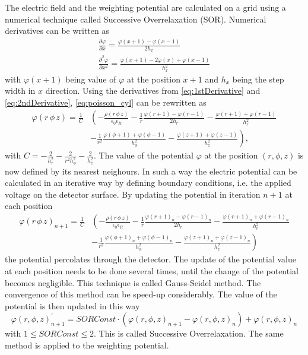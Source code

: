 The electric field and the weighting potential are calculated on a
grid using a numerical technique called Successive Overrelaxation
(SOR). Numerical derivatives can be written as 
\begin{eqnarray}
\frac{\partial \varphi}{\partial x} = \frac{\varphi(x+1) - \varphi(x-1)}{2h_{x}} \label{eq:1stDerivative} \\
\frac{\partial^{2} \varphi}{\partial x^{2}} = \frac{\varphi(x+1) - 2 \varphi(x) + \varphi(x-1)}{h^{2}_{x}} 
\label{eq:2ndDerivative}
\end{eqnarray}
 with $\varphi(x+1)$ being value of $\varphi$ at the
position $x+1$ and $h_{x}$ being the step width in $x$ direction. Using the derivatives from \eqref{eq:1stDerivative} and \eqref{eq:2ndDerivative}, \eqref{eq:poisson_cyl} can be rewritten as 
\begin{equation}
\begin{split}
\varphi(r \,\phi \, z) = 
\frac{1}{C} & \left( -\frac{\rho(r \, \phi \, z)}{\epsilon_{0}
\epsilon_{R}} - \frac{1}{r}\frac{\varphi(r+1) - \varphi(r-1)}{2h_{r}} - 
\frac{\varphi(r+1) + \varphi(r-1)}{h_{r}^{2}} \right. \\ 
& \left. - \frac{1}{r^{2}} \frac{\varphi(\phi+1) + \varphi(\phi-1) }{h_{\phi}^{2}} - \frac{\varphi(z+1) + \varphi(z-1)}{h_{z}^{2}} \right ) , 
\end{split}
\label{eq:PotentialByNN}
\end{equation}
with $C = - \frac{2}{h_{r}^{2}} -
\frac{2}{r^{2}h_{\phi}^{2}} - \frac{2}{h_{z}^{2}}  $.
The value of the
potential $\varphi$ at the position $(r,\phi,z)$ is now defined by its
nearest neighours. In such a way the electric potential can be
calculated in an iterative way by defining boundary conditions,
i.e. the applied voltage on the detector surface. By updating the
potential in iteration $n+1$ at each position 
\begin{equation}
\begin{split}
\varphi(r \,\phi \, z)_{n+1}
= \frac{1}{C} & \left( -\frac{\rho(r \, \phi \, z)}{\epsilon_{0}
\epsilon_{R}} \right. - \frac{1}{r}\frac{\varphi(r+1)_{n} -
\varphi(r-1)_{n}}{2h_{r}} - \frac{\varphi(r+1)_{n} + \varphi(r-1)_{n}}{h_{r}^{2}} \\
&  -\left. \frac{1}{r^{2}} \frac{\varphi(\phi+1)_{n} +
\varphi(\phi-1)_{n} }{h_{\phi}^{2}} - \frac{\varphi(z+1)_{n} +
\varphi(z-1)_{n}}{h_{z}^{2}} \right) 
\end{split}
\label{eq:PotentialIteration}
\end{equation}
the potential percolates through the
detector. The update of the potential value at each position needs to
be done several times, until the change of the potential becomes
negligible. This technique is called Gauss-Seidel method. The
convergence of this method can be speed-up considerably. The value of
the potential is then updated in this way 
\begin{equation}
\varphi(r, \phi, z)_{n+1}^{'} =
SORConst \cdot (\varphi(r, \phi, z)_{n+1} - \varphi(r, \phi, z)_{n}) +
\varphi(r, \phi, z)_{n}
\label{eq:SOR}
\end{equation}
 with $1 \le SORConst \le 2$. This is called
Successive Overrelaxation. 
The same method is applied to the weighting potential.

